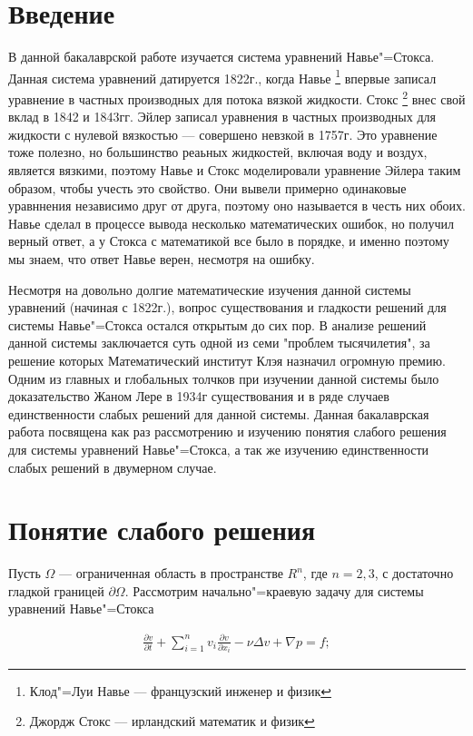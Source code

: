 \section*{Введение}
В данной бакалаврской работе изучается система уравнений Навье"=Стокса. Данная система уравнений датируется 1822г., когда 
Навье \footnote{Клод"=Луи Навье --- французский инженер и физик} впервые записал уравнение в частных производных для потока 
вязкой жидкости. Стокс \footnote{Джордж Стокс --- ирландский математик и физик} внес свой вклад в 1842 и 1843гг. Эйлер 
записал уравнения в частных производных для жидкости с нулевой вязкостью --- совершено невзкой в 1757г. Это уравнение 
тоже полезно, но большинство реаьных жидкостей, включая воду и воздух, является вязкими, поэтому Навье и Стокс 
моделировали уравнение Эйлера таким образом, чтобы учесть это свойство. Они вывели примерно одинаковые уравннения независимо
друг от друга, поэтому оно называется в честь них обоих. Навье сделал в процессе вывода несколько математических ошибок, но
получил верный ответ, а у Стокса с математикой все было в порядке, и именно поэтому мы знаем, что ответ Навье верен, несмотря 
на ошибку.

Несмотря на довольно долгие математические изучения данной системы уравнений (начиная с 1822г.), вопрос существования и 
гладкости решений для системы Навье"=Стокса остался открытым до сих пор. В анализе решений данной системы заключается суть 
одной из семи "проблем тысячилетия", за решение которых Математический институт Клэя назначил огромную премию. Одним из 
главных и глобальных толчков при изучении данной системы было доказательство Жаном Лере в 1934г существования и в ряде 
случаев единственности слабых решений для данной системы. Данная бакалаврская работа посвящена как раз рассмотрению и
изучению понятия слабого решения для системы уравнений Навье"=Стокса, а так же изучению единственности слабых решений 
в двумерном случае.
\clearpage

\section {Понятие слабого решения}
Пусть $\Omega$ --- ограниченная область в пространстве $R^n$, где $n=2, 3$, с достаточно гладкой границей $\partial\Omega$.
Рассмотрим начально"=краевую задачу для системы уравнений Навье"=Стокса

\begin{equation}\label{eq:5.1}
    \begin{gathered}
        \frac{\partial v}{\partial t}+\sum_{i=1}^nv_i\frac{\partial v}{\partial x_i}-\nu\Delta v+\nabla p=f;
    \end{gathered}
\end{equation}

